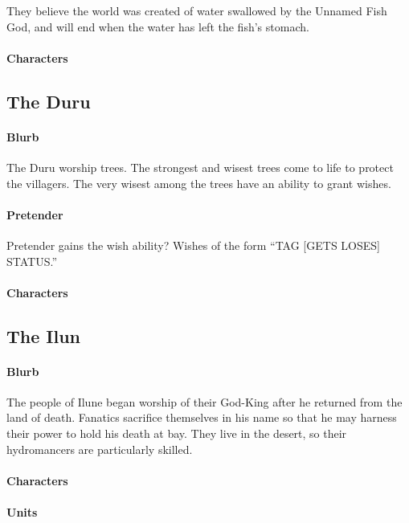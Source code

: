 \documentclass[12pt,letterpaper]{article}
\begin{document}
They believe the world was created of water swallowed by the Unnamed Fish God,
and will end when the water has left the fish's stomach.

\paragraph{Characters}

\subsection{The Duru}
\paragraph{Blurb}

The Duru worship trees.
The strongest and wisest trees come to life to protect the villagers.
The very wisest among the trees have an ability to grant wishes.

\paragraph{Pretender}

Pretender gains the wish ability?
Wishes of the form ``TAG [GETS LOSES] STATUS.''

\paragraph{Characters}

\subsection{The Ilun}
\paragraph{Blurb}

The people of Ilune began worship of their God-King
after he returned from the land of death.
Fanatics sacrifice themselves in his name
so that he may harness their power to hold his death at bay.
They live in the desert, so their hydromancers are particularly skilled.

\paragraph{Characters}

\paragraph{Units}
\end{document}
